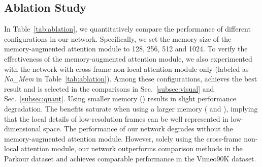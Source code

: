 \subsection{Ablation Study}\label{subsec:ablation}
In Table~\ref{tab:ablation}, we quantitatively compare the performance of different configurations in our network.
Specifically, we set the memory size  of the memory-augmented attention module to 128, 256, 512 and 1024.
To verify the effectiveness of the memory-augmented attention module, we also experimented with the network with cross-frame non-local attention module only (labeled as \textit{No\_Mem} in Table~\ref{tab:ablation}).
Among these configurations,  achieves the best result and is selected in the comparisons in Sec.~\ref{subsec:visual} and Sec.~\ref{subsec:quant}.
Using smaller memory () results in slight performance degradation.
The benefits saturate when using a larger memory ( and ), implying that the local details of low-resolution frames can be well represented in low-dimensional space.
The performance of our network degrades without the memory-augmented attention module.
However, solely using the cross-frame non-local attention module, our network outperforms comparison methods in the Parkour dataset and achieves comparable performance in the Vimeo90K dataset.
